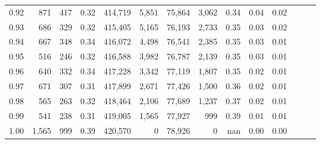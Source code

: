 \begin{tabular}{rrrrrrrrrrrrrr}
0.92 &    871 &    417 &  0.32 &  414,719 &    5,851 &  75,864 &   3,062 &  0.34 &  0.04 &      0.02 \\
0.93 &    686 &    329 &  0.32 &  415,405 &    5,165 &  76,193 &   2,733 &  0.35 &  0.03 &      0.02 \\
0.94 &    667 &    348 &  0.34 &  416,072 &    4,498 &  76,541 &   2,385 &  0.35 &  0.03 &      0.01 \\
0.95 &    516 &    246 &  0.32 &  416,588 &    3,982 &  76,787 &   2,139 &  0.35 &  0.03 &      0.01 \\
0.96 &    640 &    332 &  0.34 &  417,228 &    3,342 &  77,119 &   1,807 &  0.35 &  0.02 &      0.01 \\
0.97 &    671 &    307 &  0.31 &  417,899 &    2,671 &  77,426 &   1,500 &  0.36 &  0.02 &      0.01 \\
0.98 &    565 &    263 &  0.32 &  418,464 &    2,106 &  77,689 &   1,237 &  0.37 &  0.02 &      0.01 \\
0.99 &    541 &    238 &  0.31 &  419,005 &    1,565 &  77,927 &     999 &  0.39 &  0.01 &      0.01 \\
1.00 &  1,565 &    999 &  0.39 &  420,570 &        0 &  78,926 &       0 &   nan &  0.00 &      0.00 \\
\bottomrule
\end{tabular}
